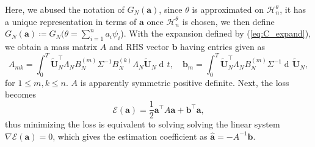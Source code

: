 \documentclass[11pt]{article} %
\def\va{{\bm{a}}}
\def\vb{{\bm{b}}}
\def\gH{{\mathcal{H}}}
\DeclareMathOperator{\dif}{d \!}        %
\def\rvU{{\mathbf{U}}}
\newcommand{\loss}{\mathcal{E}}
\begin{document}
Here, we abused the notation of $G_N(\va)$, since $\theta$ is approximated on $\gH^\theta_n$, it has a unique representation in terms of $\va$ once $\gH^\theta_n$ is chosen, we then define $G_N(\va) \coloneqq G_N(\theta = \sum_{i = 1}^n a_i\psi_i$).  With the expansion defined by (\ref{eq:C_expand}), we obtain a mass matrix $A$ and RHS vector $\vb$ having entries given as
\[
A_{mk} =\int_{0}^{T} \tilde{\rvU}^{\intercal}_N\Lambda_N B_N^{(m)}\Sigma^{-1}B_N^{(k)}\Lambda_N \tilde\rvU_N \dif t, \quad \vb_{m}=\int_{0}^{T}
       \tilde{\rvU}^{\intercal}_N\Lambda_N B_N^{(m)}\Sigma^{-1} \dif \tilde\rvU_N,
\]
for \(1\le m,k\le n\).  $A$ is apparently symmetric positive definite.  Next, the loss becomes
\[
\loss(\va) = \frac{1}{2}\va^\intercal A\va + \vb^\intercal\va,
\]
thus minimizing the loss is equivalent to solving solving the linear system \(\nabla\loss(\va)=0\), which gives the estimation coefficient as $\hat\va = -A^{-1}\vb$.
%
\end{document}
